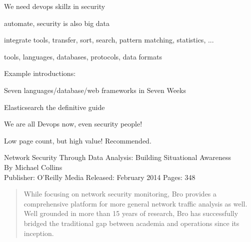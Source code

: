 \documentclass[20pt,landscape,a4paper,footrule]{foils}
\begin{document}
\begin{list1}
\item We need devops skillz in security
\item automate, security is also big data
\item integrate tools, transfer, sort, search, pattern matching, statistics, ...
\item tools, languages, databases, protocols, data formats
\item Example introductions:
\begin{list2}
\item Seven languages/database/web frameworks in Seven Weeks
\item Elasticsearch the definitive guide\\
\item {}
\item {}
\end{list2}
\end{list1}

\centerline{We are all Devops now, even security people!}





Low page count, but high value! Recommended.

Network Security Through Data Analysis: Building Situational Awareness\\
By Michael Collins\\
Publisher: O'Reilly Media
Released: February 2014 Pages: 348





\begin{quote}
While focusing on network security monitoring, Bro provides a comprehensive platform for more general network traffic analysis as well. Well grounded in more than 15 years of research, Bro has successfully bridged the traditional gap between academia and operations since its inception.
\end{quote}


\end{document}
